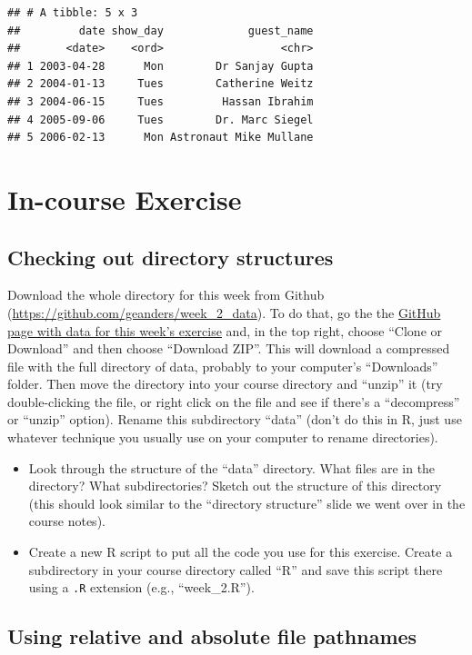 \documentclass[]{book}
\providecommand{\tightlist}{%
  \setlength{\itemsep}{0pt}\setlength{\parskip}{0pt}}
\theoremstyle{definition}
\theoremstyle{definition}
\theoremstyle{definition}
\theoremstyle{remark}
\begin{document}
\begin{verbatim}
## # A tibble: 5 x 3
##         date show_day             guest_name
##       <date>    <ord>                  <chr>
## 1 2003-04-28      Mon        Dr Sanjay Gupta
## 2 2004-01-13     Tues        Catherine Weitz
## 3 2004-06-15     Tues         Hassan Ibrahim
## 4 2005-09-06     Tues        Dr. Marc Siegel
## 5 2006-02-13      Mon Astronaut Mike Mullane
\end{verbatim}

\section{In-course Exercise}\label{in-course-exercise-1}

\subsection{Checking out directory
structures}\label{checking-out-directory-structures}

Download the whole directory for this week from Github
(\url{https://github.com/geanders/week_2_data}). To do that, go the the
\href{https://github.com/geanders/week_2_data}{GitHub page with data for
this week's exercise} and, in the top right, choose ``Clone or
Download'' and then choose ``Download ZIP''. This will download a
compressed file with the full directory of data, probably to your
computer's ``Downloads'' folder. Then move the directory into your
course directory and ``unzip'' it (try double-clicking the file, or
right click on the file and see if there's a ``decompress'' or ``unzip''
option). Rename this subdirectory ``data'' (don't do this in R, just use
whatever technique you usually use on your computer to rename
directories).

\begin{itemize}
\tightlist
\item
  Look through the structure of the ``data'' directory. What files are
  in the directory? What subdirectories? Sketch out the structure of
  this directory (this should look similar to the ``directory
  structure'' slide we went over in the course notes).
\item
  Create a new R script to put all the code you use for this exercise.
  Create a subdirectory in your course directory called ``R'' and save
  this script there using a \texttt{.R} extension (e.g., ``week\_2.R'').
\end{itemize}

\subsection{Using relative and absolute file
pathnames}\label{using-relative-and-absolute-file-pathnames}
\end{document}
